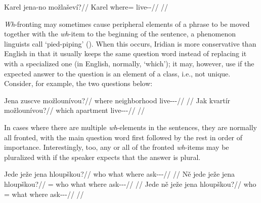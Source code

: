 \pex
\begingl
\gla Karel jena-no možlaševí?//
\glb Karel where=\Q{} live-\Av{}-\Cont{}//
\glft {}//
\endgl
\xe


\emph{Wh}-fronting may sometimes cause peripheral elements of a phrase to be
moved together with the \emph{wh}-item to the beginning of the sentence, a
phenomenon linguists call `pied-piping' (\cite[263-4]{ross1967}). When this
occurs, Iridian is more conservative than English in that it usually keeps the
same question word instead of replacing it with a specialized one (in English,
normally, `which'); it may, however, use  if the expected
answer to the question is an element of a class, i.e., not unique. Consider, for
example, the two questions below:

\pex
\a
\begingl
\gla Jena zuscve možlounívou?//
\glb where neighborhood live-\Lv{}-\Cont{}-\Nz{}//
\glft {}//
\endgl
\a
\begingl
\gla Jak kvartír možlounívou?//
\glb which apartment live-\Lv{}-\Cont{}-\Nz{}//
\glft {}//
\endgl
\xe

In cases where there are multiple \emph{wh}-elements in the sentences, they are
normally all fronted, with the main question word first followed by the rest in
order of importance. Interestingly, too, any or all of the fronted
\emph{wh}-items may be pluralized with  if the speaker expects that the
answer is plural.

\pex
\a\begingl
\gla Jede ježe jena hloupškou?//
\glb who what where ask-\Av{}-\Pf{}-\Nz{}//
\glft {}//
\endgl
\a\begingl
\gla Ně jede ježe jena hloupškou?//
\glb \Pl{}= who what where ask-\Av{}-\Pf{}-\Nz{}//
\glft {}//
\endgl
\a\begingl
\gla Jede ně ježe jena hloupškou?//
\glb who \Pl{}= what where ask-\Av{}-\Pf{}-\Nz{}//
\glft {}//
\endgl
\xe

